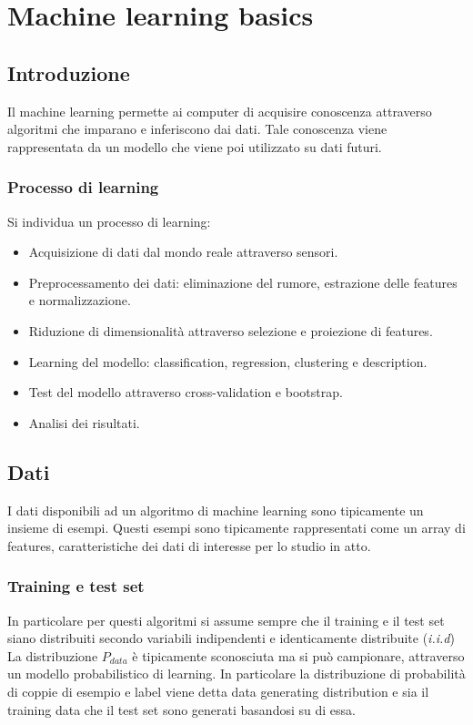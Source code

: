 \chapter{Machine learning basics}

\section{Introduzione}
Il machine learning permette ai computer di acquisire conoscenza attraverso algoritmi che imparano e inferiscono dai dati.
Tale conoscenza viene rappresentata da un modello che viene poi utilizzato su dati futuri.

	\subsection{Processo di learning}
	Si individua un processo di learning:
	\begin{multicols}{2}
		\begin{itemize}
			\item Acquisizione di dati dal mondo reale attraverso sensori.
			\item Preprocessamento dei dati: eliminazione del rumore, estrazione delle features e normalizzazione.
			\item Riduzione di dimensionalit\`a attraverso selezione e proiezione di features.
			\item Learning del modello: classification, regression, clustering e description.
			\item Test del modello attraverso cross-validation e bootstrap.
			\item Analisi dei risultati.
		\end{itemize}
	\end{multicols}

\section{Dati}
I dati disponibili ad un algoritmo di machine learning sono tipicamente un insieme di esempi.
Questi esempi sono tipicamente rappresentati come un array di features, caratteristiche dei dati di interesse per lo studio in atto.

	\subsection{Training e test set}
	In particolare per questi algoritmi si assume sempre che il training e il test set siano distribuiti secondo variabili indipendenti e identicamente distribuite (\emph{i.i.d})
	La distribuzione $P_{data}$ \`e tipicamente sconosciuta ma si pu\`o campionare, attraverso un modello probabilistico di learning.
	In particolare la distribuzione di probabilit\`a di coppie di esempio e label viene detta data generating distribution e sia il training data che il test set sono generati basandosi su di essa.

